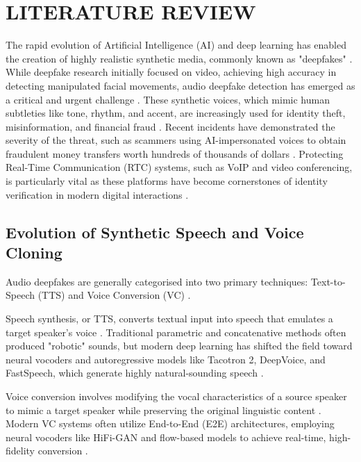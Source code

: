 \newpage
\section{LITERATURE REVIEW}

The rapid evolution of Artificial Intelligence (AI) and deep learning has enabled the creation of highly realistic synthetic media, commonly known as "deepfakes" \cite{Reddy2025, Raza2026}. While deepfake research initially focused on video, achieving high accuracy in detecting manipulated facial movements, audio deepfake detection has emerged as a critical and urgent challenge \cite{Reddy2025, Yamagishi2021}. These synthetic voices, which mimic human subtleties like tone, rhythm, and accent, are increasingly used for identity theft, misinformation, and financial fraud \cite{Reddy2025, Li2024_survey}. Recent incidents have demonstrated the severity of the threat, such as scammers using AI-impersonated voices to obtain fraudulent money transfers worth hundreds of thousands of dollars \cite{Pianese2022, Mathew2024, Xue2025_RTCFake}. Protecting Real-Time Communication (RTC) systems, such as VoIP and video conferencing, is particularly vital as these platforms have become cornerstones of identity verification in modern digital interactions \cite{Mathew2024, Wang2024_asv5}.

\subsection{Evolution of Synthetic Speech and Voice Cloning}

Audio deepfakes are generally categorised into two primary techniques: Text-to-Speech (TTS) and Voice Conversion (VC) \cite{Li2024_survey, Azzuni2024}.

Speech synthesis, or TTS, converts textual input into speech that emulates a target speaker's voice \cite{Reddy2025, Li2024_survey}. Traditional parametric and concatenative methods often produced "robotic" sounds, but modern deep learning has shifted the field toward neural vocoders and autoregressive models like Tacotron 2, DeepVoice, and FastSpeech, which generate highly natural-sounding speech \cite{Azzuni2024, ZhangB2025}.

Voice conversion involves modifying the vocal characteristics of a source speaker to mimic a target speaker while preserving the original linguistic content \cite{Li2024_survey, Azzuni2024}. Modern VC systems often utilize End-to-End (E2E) architectures, employing neural vocoders like HiFi-GAN and flow-based models to achieve real-time, high-fidelity conversion \cite{Azzuni2024, Bird2023}.

